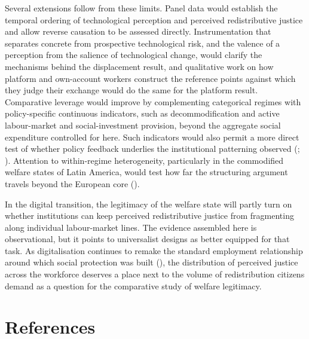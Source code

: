 \documentclass[
  12pt,
]{article}
\begin{document}
Several extensions follow from these limits. Panel data would establish
the temporal ordering of technological perception and perceived
redistributive justice and allow reverse causation to be assessed
directly. Instrumentation that separates concrete from prospective
technological risk, and the valence of a perception from the salience of
technological change, would clarify the mechanisms behind the
displacement result, and qualitative work on how platform and
own-account workers construct the reference points against which they
judge their exchange would do the same for the platform result.
Comparative leverage would improve by complementing categorical regimes
with policy-specific continuous indicators, such as decommodification
and active labour-market and social-investment provision, beyond the
aggregate social expenditure controlled for here. Such indicators would
also permit a more direct test of whether policy feedback underlies the
institutional patterning observed (; ). Attention to within-regime heterogeneity, particularly in the
commodified welfare states of Latin America, would test how far the
structuring argument travels beyond the European core
().

In the digital transition, the legitimacy of the welfare state will
partly turn on whether institutions can keep perceived redistributive
justice from fragmenting along individual labour-market lines. The
evidence assembled here is observational, but it points to universalist
designs as better equipped for that task. As digitalisation continues to
remake the standard employment relationship around which social
protection was built
(),
the distribution of perceived justice across the workforce deserves a
place next to the volume of redistribution citizens demand as a question
for the comparative study of welfare legitimacy.

\section{References}\label{references}
\end{document}
